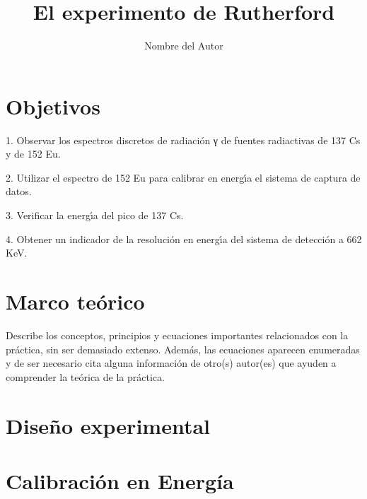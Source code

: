 \documentclass[twocolumn,a4paper,11pt]{scrartcl}
\title{El experimento de Rutherford}
\author{Nombre del Autor}
\date{}
\begin{document}

\section{Objetivos}
1. Observar los espectros discretos de radiación γ de fuentes radiactivas de 137 Cs y de 152 Eu.

2. Utilizar el espectro de 152 Eu para calibrar en energı́a el sistema de captura de datos.

3. Verificar la energı́a del pico de 137 Cs.

4. Obtener un indicador de la resolución en energı́a del sistema de detección a 662 KeV.

\section{Marco teórico}
Describe los conceptos, principios y ecuaciones importantes relacionados con la práctica, sin ser demasiado extenso. Además, las ecuaciones aparecen enumeradas y de ser necesario cita alguna información de otro(s) autor(es) que ayuden a comprender la teórica de la práctica.

\section{Diseño experimental}
\section{Calibración en Energía}
\end{document}
